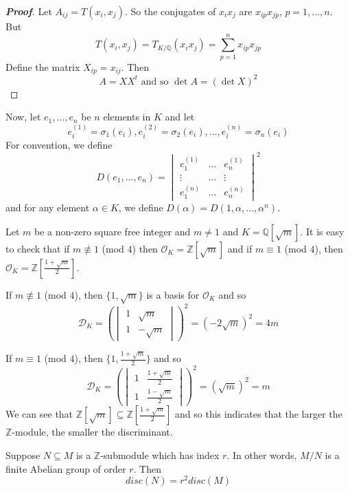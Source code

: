 \begin{proof}[\bf Proof] Let $A_{ij}=T(x_i,x_j)$. So the conjugates of $x_ix_j$ are $x_{ip}x_{jp}$, $p=1,\ldots,n$. But
$$T(x_i,x_j)=T_{K/\mathbb{Q}}(x_ix_j)=\sum_{p=1}^n x_{ip}x_{jp}$$
Define the matrix $X_{ip}=x_{ij}$. Then
$$A=XX^t \text{ and so } \det{A}=(\det{X})^2$$
\end{proof}
Now, let $e_1,\ldots,e_n$ be $n$ elements in $K$ and let
$$e^{(1)}_i=\sigma_1(e_i),e^{(2)}_i=\sigma_2(e_i),\ldots,e^{(n)}_i=\sigma_n(e_i)$$
For convention, we define
\begin{equation*}
D(e_1,\ldots,e_n)= \begin{vmatrix} e^{(1)}_1 & \ldots & e^{(1)}_n\\ \vdots & \ldots &\vdots\\
e^{(n)}_1 & \ldots & e^{(n)}_n \end{vmatrix}^2
\end{equation*}
and for any element $\alpha \in K$, we define $D(\alpha)=D(1,\alpha,\ldots,\alpha^n)$.
\begin{example} Let $m$ be a non-zero square free integer and $m \neq 1$ and $K=\mathbb{Q}[\sqrt{m}]$. It is easy to check that if $m \not \equiv 1$ (mod $4$) then $\mathcal{O}_K=\mathbb{Z}[\sqrt{m}]$ and if $m \equiv 1$ (mod $4$),
then $\mathcal{O}_K=\mathbb{Z}[\frac{1+\sqrt{m}}{2}]$.

If $m \not \equiv 1$ (mod $4$), then $\{1,\sqrt{m}\}$ is a basis for $\mathcal{O}_K$ and so
\begin{equation*} \mathcal{D}_K = \left(\begin{vmatrix} 1&\sqrt{m}\\1&-\sqrt{m} \end{vmatrix}\right)^2
=(-2\sqrt{m})^2=4m
\end{equation*}

If $m \equiv 1$ (mod $4$), then $\{1,\frac{1+\sqrt{m}}{2}\}$ and so
\begin{equation*} \mathcal{D}_K = \left(\begin{vmatrix} 1&\frac{1+\sqrt{m}}{2}\\1&\frac{1-\sqrt{m}}{2} \end{vmatrix}\right)^2
=(\sqrt{m})^2=m
\end{equation*}
We can see that $\mathbb{Z}[\sqrt{m}] \subseteq \mathbb{Z}[\frac{1+\sqrt{m}}{2}]$ and so this indicates that the larger the $\mathbb{Z}$-module, the smaller the discriminant.
\end{example}
\begin{theorem} Suppose $N \subseteq M$ is a $\mathbb{Z}$-submodule which has index $r$. In other words,
$M/N$ is a finite Abelian group of order $r$. Then
$$disc(N)=r^2 disc(M)$$
\end{theorem}
